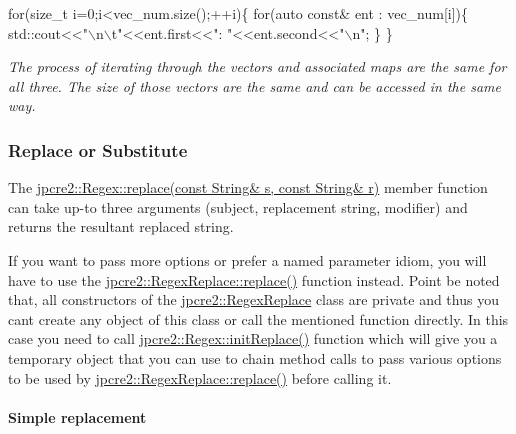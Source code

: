 \begin{DoxyCode}
\textcolor{keywordflow}{for}(\textcolor{keywordtype}{size\_t} i=0;i<vec\_num.size();++i)\{
    \textcolor{keywordflow}{for}(\textcolor{keyword}{auto} \textcolor{keyword}{const}& ent : vec\_num[i])\{
        std::cout<<\textcolor{stringliteral}{"\(\backslash\)n\(\backslash\)t"}<<ent.first<<\textcolor{stringliteral}{": "}<<ent.second<<\textcolor{stringliteral}{"\(\backslash\)n"};
    \}
\}
\end{DoxyCode}


{\itshape The process of iterating through the vectors and associated maps are the same for all three. The size of those vectors are the same and can be accessed in the same way.}\hypertarget{index_replace}{}\subsubsection{Replace or Substitute}\label{index_replace}
The {\ttfamily \hyperlink{classjpcre2_1_1Regex_addd7c21abd0f4cf6c532a7602cfb5835_addd7c21abd0f4cf6c532a7602cfb5835}{jpcre2\+::\+Regex\+::replace(const String\& s, const String\& r)}} member function can take up-\/to three arguments (subject, replacement string, modifier) and returns the resultant replaced string.

If you want to pass more options or prefer a named parameter idiom, you will have to use the {\ttfamily \hyperlink{classjpcre2_1_1RegexReplace_afd087fa7a9bfedec802d1a3dd7edbdd0_afd087fa7a9bfedec802d1a3dd7edbdd0}{jpcre2\+::\+Regex\+Replace\+::replace()}} function instead. Point be noted that, all constructors of the {\ttfamily \hyperlink{classjpcre2_1_1RegexReplace}{jpcre2\+::\+Regex\+Replace}} class are private and thus you can\textquotesingle{}t create any object of this class or call the mentioned function directly. In this case you need to call {\ttfamily \hyperlink{classjpcre2_1_1Regex_ae7235a991492fa88f1bd3fb02d59cd0a_ae7235a991492fa88f1bd3fb02d59cd0a}{jpcre2\+::\+Regex\+::init\+Replace()}} function which will give you a temporary object that you can use to chain method calls to pass various options to be used by {\ttfamily \hyperlink{classjpcre2_1_1RegexReplace_afd087fa7a9bfedec802d1a3dd7edbdd0_afd087fa7a9bfedec802d1a3dd7edbdd0}{jpcre2\+::\+Regex\+Replace\+::replace()}} before calling it.\hypertarget{index_simple-replace}{}\paragraph{Simple replacement}\label{index_simple-replace}

